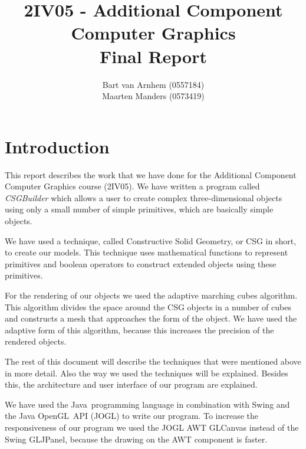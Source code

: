 \documentclass[a4paper,10pt,twocolumn]{article}
\title{2IV05 - Additional Component Computer Graphics \\ Final Report}
\author{Bart van Arnhem (0557184) \\ Maarten Manders (0573419)}
\begin{document}
\maketitle
\thispagestyle{empty}

\onecolumn
\tableofcontents
\setcounter{page}{1}
\twocolumn
\section{Introduction}
This report describes the work that we have done for the Additional Component Computer Graphics course (2IV05). We have written a program called \textit{CSGBuilder} which allows a user to create complex three-dimensional objects using only a small number of simple primitives, which are basically simple objects.

We have used a technique, called Constructive Solid Geometry, or CSG in short, to create our models. This technique uses mathematical functions to represent primitives and boolean operators to construct extended objects using these primitives.

For the rendering of our objects we used the adaptive marching cubes algorithm. This algorithm divides the space around the CSG objects in a number of cubes and constructs a mesh that approaches the form of the object. We have used the adaptive form of this algorithm, because this increases the precision of the rendered objects.

The rest of this document will describe the techniques that were mentioned above in more detail. Also the way we used the techniques will be explained. Besides this, the architecture and user interface of our program are explained.

We have used the Java\textcopyright\ programming language in combination with Swing and the Java OpenGL\texttrademark\ API (JOGL) to write our program. To increase the responsiveness of our program we used the JOGL AWT GLCanvas instead of the Swing GLJPanel, because the drawing on the AWT component is faster.
\end{document}
